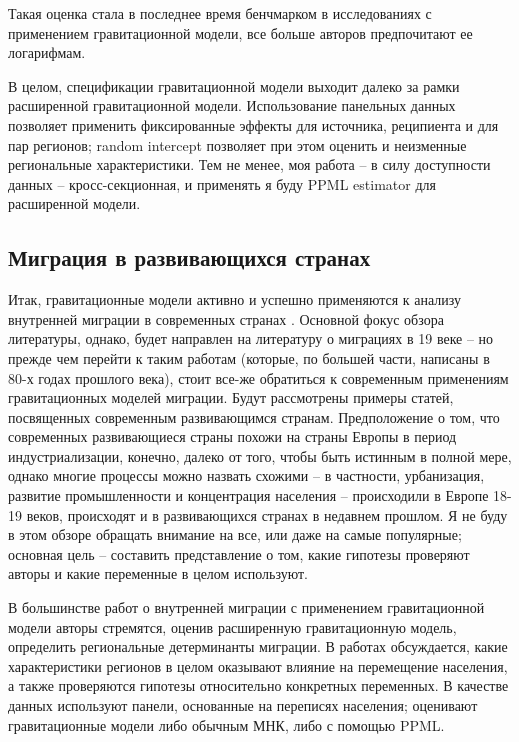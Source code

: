 \documentclass[a4paper,12pt]{article}
\begin{document}

Такая оценка стала в последнее время бенчмарком в исследованиях с применением гравитационной модели, все больше авторов предпочитают ее логарифмам.

В целом, спецификации гравитационной модели выходит далеко за рамки расширенной гравитационной модели. Использование панельных данных позволяет применить фиксированные эффекты для источника, реципиента и для пар регионов; random intercept позволяет при этом оценить и неизменные региональные характеристики. Тем не менее, моя работа -- в силу доступности данных -- кросс-секционная, и применять я буду PPML estimator для расширенной модели.


\subsection{Миграция в развивающихся странах}\label{sec:developing}

Итак, гравитационные модели активно и успешно применяются к анализу внутренней миграции в современных странах \citep{andrienko_determinants_2004, guriev_breaking_2015, molloy_internal_2011, etzo_internal_2008}.
Основной фокус обзора литературы, однако, будет направлен на литературу о миграциях в 19 веке -- но прежде чем перейти к таким работам (которые, по большей части, написаны в 80-х годах прошлого века), стоит все-же обратиться к современным применениям гравитационных моделей миграции. Будут рассмотрены примеры статей, посвященных современным развивающимся странам. 
Предположение о том, что современных развивающиеся страны похожи на страны Европы в период индустриализации, конечно, далеко от того, чтобы быть истинным в полной мере, однако многие процессы можно назвать схожими -- в частности, урбанизация, развитие промышленности и концентрация населения -- происходили в Европе 18-19 веков, происходят и в развивающихся странах в недавнем прошлом. 
Я не буду в этом обзоре обращать внимание на все, или даже на самые популярные; основная цель – составить представление о том, какие гипотезы проверяют авторы и какие переменные в целом используют.

В большинстве работ о внутренней миграции с применением гравитационной модели авторы стремятся, оценив расширенную гравитационную модель, определить региональные детерминанты миграции. В работах обсуждается, какие характеристики регионов в целом оказывают влияние на перемещение населения, а также проверяются гипотезы относительно конкретных переменных. В качестве данных используют панели, основанные на переписях населения; оценивают гравитационные модели либо обычным МНК, либо с помощью PPML.
\end{document}

